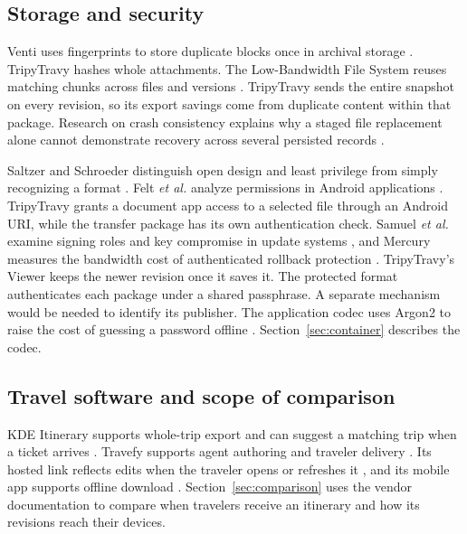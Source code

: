 \subsection{Storage and security}
Venti uses fingerprints to store duplicate blocks once in archival storage \cite{venti}. TripyTravy hashes whole attachments. The Low-Bandwidth File System reuses matching chunks across files and versions \cite{lbfs}. TripyTravy sends the entire snapshot on every revision, so its export savings come from duplicate content within that package. Research on crash consistency explains why a staged file replacement alone cannot demonstrate recovery across several persisted records \cite{crash}.

Saltzer and Schroeder distinguish open design and least privilege from simply recognizing a format \cite{saltzer}. Felt \emph{et al.} analyze permissions in Android applications \cite{permissions}. TripyTravy grants a document app access to a selected file through an Android URI, while the transfer package has its own authentication check. Samuel \emph{et al.} examine signing roles and key compromise in update systems \cite{tuf}, and Mercury measures the bandwidth cost of authenticated rollback protection \cite{mercury}. TripyTravy's Viewer keeps the newer revision once it saves it. The protected format authenticates each package under a shared passphrase. A separate mechanism would be needed to identify its publisher. The application codec uses Argon2 to raise the cost of guessing a password offline \cite{argon}. Section~\ref{sec:container} describes the codec.

\subsection{Travel software and scope of comparison}
KDE Itinerary supports whole-trip export and can suggest a matching trip when a ticket arrives \cite{kde}. Travefy supports agent authoring and traveler delivery \cite{travefybuilder}. Its hosted link reflects edits when the traveler opens or refreshes it \cite{travefyupdates}, and its mobile app supports offline download \cite{travefyoffline}. Section~\ref{sec:comparison} uses the vendor documentation to compare when travelers receive an itinerary and how its revisions reach their devices.
